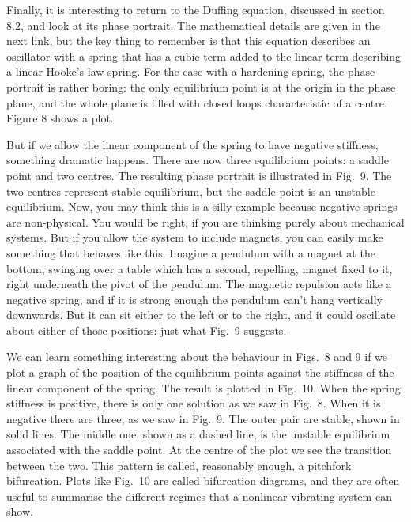   Finally, it is interesting to return to the Duffing equation, discussed in 
  section 8.2, and look at its phase portrait. The mathematical details are 
  given in the next link, but the key thing to remember is that this equation 
  describes an oscillator with a spring that has a cubic term added to the 
  linear term describing a linear Hooke's law spring. For the case with a 
  hardening spring, the phase portrait is rather boring: the only equilibrium 
  point is at the origin in the phase plane, and the whole plane is filled with 
  closed loops characteristic of a centre. Figure 8 shows a plot. 

  But if we allow the linear component of the spring to have negative 
  stiffness, something dramatic happens. There are now three equilibrium 
  points: a saddle point and two centres. The resulting phase portrait is 
  illustrated in Fig.\ 9. The two centres represent stable equilibrium, but the 
  saddle point is an unstable equilibrium. Now, you may think this is a silly 
  example because negative springs are non-physical. You would be right, if you 
  are thinking purely about mechanical systems. But if you allow the system to 
  include magnets, you can easily make something that behaves like this. 
  Imagine a pendulum with a magnet at the bottom, swinging over a table which 
  has a second, repelling, magnet fixed to it, right underneath the pivot of 
  the pendulum. The magnetic repulsion acts like a negative spring, and if it 
  is strong enough the pendulum can't hang vertically downwards. But it can sit 
  either to the left or to the right, and it could oscillate about either of 
  those positions: just what Fig.\ 9 suggests. 

  We can learn something interesting about the behaviour in Figs.\ 8 and 9 if 
  we plot a graph of the position of the equilibrium points against the 
  stiffness of the linear component of the spring. The result is plotted in 
  Fig.\ 10. When the spring stiffness is positive, there is only one solution 
  as we saw in Fig.\ 8. When it is negative there are three, as we saw in Fig.\ 
  9. The outer pair are stable, shown in solid lines. The middle one, shown as 
  a dashed line, is the unstable equilibrium associated with the saddle point. 
  At the centre of the plot we see the transition between the two. This pattern 
  is called, reasonably enough, a pitchfork bifurcation. Plots like Fig.\ 10 
  are called bifurcation diagrams, and they are often useful to summarise the 
  different regimes that a nonlinear vibrating system can show. 

